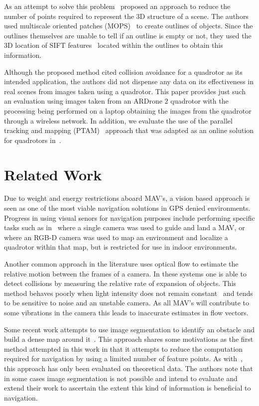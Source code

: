 \documentclass{acmsiggraph}
\begin{document}
As an attempt to solve this problem~\cite{lee2011} proposed an approach to reduce the number of points required to 
represent the 3D structure of a scene.  The authors used multiscale oriented patches (MOPS)~\cite{BSW05} to create outlines of 
objects.  Since the outlines themselves are unable to tell if an outline is empty or not, they used the 3D location of SIFT 
features~\cite{lowe2004} located within the outlines to obtain this information.  

Although the proposed method cited collision avoidance for a quadrotor as its intended application, the authors did not 
dispense any data on its effectiveness in real scenes from images taken using a quadrotor.  This paper provides just such an 
evaluation using images taken from an ARDrone 2 quadrotor with the processing being performed on a laptop obtaining the 
images from the quadrotor through a wireless network. In addition, we evaluate the use of the parallel tracking and 
mapping (PTAM)~\cite{klein07parallel} approach that was adapted as an online solution for quadrotors in~\cite{weiss2011}.

\section{Related Work}
Due to weight and energy restrictions aboard MAV's, a vision based approach is seen as one of the most viable navigation 
solutions in GPS denied environments.  Progress in using visual senors for navigation purposes include performing specific 
tasks such as in~\cite{johnson2005} where a single camera was used to guide and land a MAV, or~\cite{huang2011isrr} where an 
RGB-D camera was used to map an environment and localize a quadrotor within that map, but is restricted for use in indoor
environments.

Another common approach in the literature uses optical flow to estimate the relative motion between the frames of a camera.
In these systems one is able to detect collisions by measuring the relative rate of expansion of objects.  This method 
behaves poorly when light intensity does not remain constant~\cite{horn1981} and tends to be sensitive to noise and
an unstable camera.  As all MAV's will contribute to some vibrations in the camera this leads to inaccurate estimates in
flow vectors.

Some recent work attempts to use image segmentation to identify an obstacle and build a dense map around it~\cite{ha2012}.  
This approach shares some motivations as the first method attempted in this work in that it attempts to reduce the computation required for navigation by using a limited number of feature points.  As with~\cite{lee2011}, this approach
has only been evaluated on theoretical data.  The authors note that in some cases image segmentation is not possible and 
intend to evaluate and extend their work to ascertain the extent this kind of information is beneficial to navigation.
\end{document}
